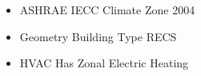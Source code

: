 \begin{itemize}
\item ASHRAE IECC Climate Zone 2004
\item Geometry Building Type RECS
\item HVAC Has Zonal Electric Heating
\end{itemize}
